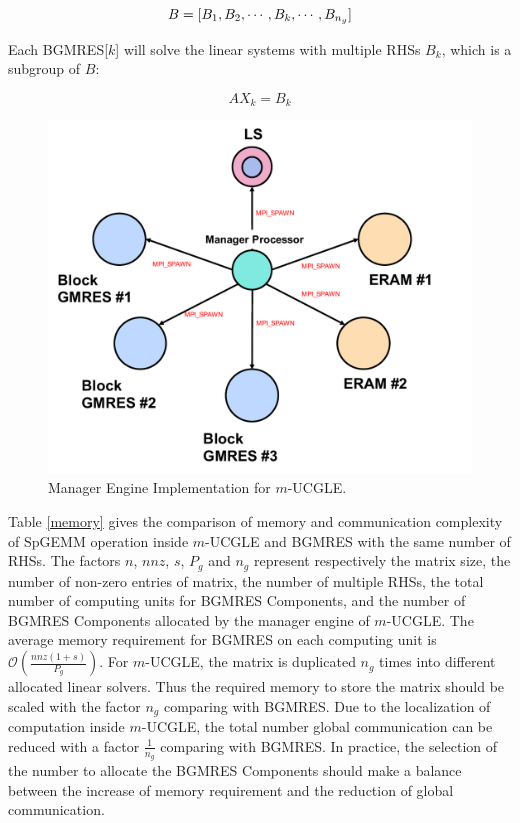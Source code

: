 \begin{equation}
B = [B_1, B_2, \cdots, B_k, \cdots, B_{n_g}] ~\\
\end{equation}

Each BGMRES[$k$] will solve the linear systems with multiple RHSs $B_k$, which is a subgroup of $B$:

\begin{equation}
\label{eq_sub}
AX_k = B_k
\end{equation}

\begin{figure}[htbp]
	\centering
	\includegraphics[width=4.8in]{fig/ucmgle.pdf}
	\caption{Manager Engine Implementation for $m$-UCGLE.}
	\label{fig:ucmgle}
\end{figure}

Table \ref{memory} gives the comparison of memory and communication complexity of SpGEMM operation inside $m$-UCGLE and BGMRES with the same number of RHSs. The factors $n$, $nnz$, $s$, $P_g$ and $n_g$ represent respectively the matrix size, the number of non-zero entries of matrix, the number of multiple RHSs, the total number of computing units for BGMRES Components, and the number of BGMRES Components allocated by the manager engine of $m$-UCGLE. The average memory requirement for BGMRES on each computing unit is $\mathcal{O}(\frac{nnz(1+s)}{P_{g}})$. For $m$-UCGLE, the matrix is duplicated $n_g$ times into different allocated linear solvers. Thus the required memory to store the matrix should be scaled with the factor $n_g$ comparing with BGMRES. Due to the localization of computation inside $m$-UCGLE, the total number global communication can be reduced with a factor $\frac{1}{n_g}$ comparing with BGMRES. In practice, the selection of the number to allocate the BGMRES Components should make a balance between the increase of memory requirement and the reduction of global communication.

